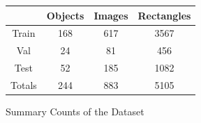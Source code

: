 \documentclass{article}
\begin{document}
\begin{figure}
\centering
\begin{tabular}{c|c|c|c|}
&Objects&Images&Rectangles\\
\hline
Train&168&617&3567\\
\hline
Val&24&81&456\\
\hline
Test&52&185&1082\\
\hline
Totals&244&883&5105\\
\hline
\end{tabular}
\caption{Summary Counts of the Dataset}
\label{fig:summary}
\end{figure}




\end{document}
